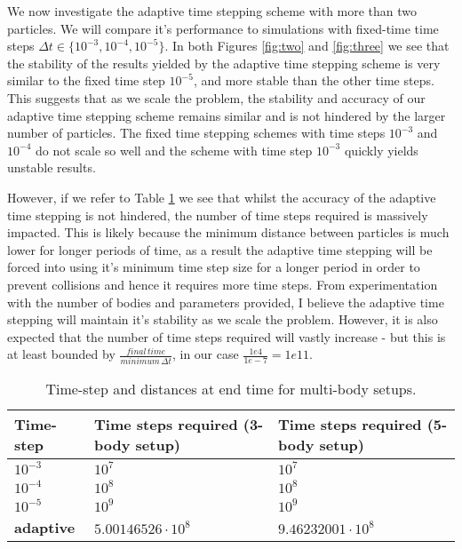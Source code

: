 \documentclass[12pt, a4paper]{article}
\begin{document}
\par We now investigate the adaptive time stepping scheme with more than two particles. We will compare it's performance to simulations with fixed-time time steps $\Delta t \in \{10^{-3}, 10^{-4}, 10^{-5}\}$. In both Figures \ref{fig:two} and \ref{fig:three} we see that the stability of the results yielded by the adaptive time stepping scheme is very similar to the fixed time step $10^{-5}$, and more stable than the other time steps. This suggests that as we scale the problem, the stability and accuracy of our adaptive time stepping scheme remains similar and is not hindered by the larger number of particles. The fixed time stepping schemes with time steps $10^{-3}$ and $10^{-4}$ do not scale so well and the scheme with  time step $10^{-3}$ quickly yields unstable results.
\par However, if we refer to Table \ref{tab:two} we see that whilst the accuracy of the adaptive time stepping is not hindered, the number of time steps required is massively impacted. This is likely because the minimum distance between particles is much lower for longer periods of time, as a result the adaptive time stepping will be forced into using it's minimum time step size for a longer period in order to prevent collisions and hence it requires more time steps. From experimentation with the number of bodies and parameters provided, I believe the adaptive time stepping will maintain it's stability as we scale the problem. However, it is also expected that the number of time steps required will vastly increase - but this is at least bounded by $\frac{final \, time}{minimum \, \Delta t}$, in our case $\frac{1e4}{1e-7} = 1e11$.

\begin{longtable}{|p{3cm}|p{7.5cm}|p{7.5cm}|}
\caption{Time-step and distances at end time for multi-body setups.}\\
\hline
\label{tab:two}
\bf{Time-step} & \bf{Time steps required (3-body setup)} &\bf{Time steps required (5-body setup)}\\ \hline

$10^{-3}$ & $10^7$&$10^7$\\ \hline
$10^{-4}$ & $10^8$ & $10^8$\\ \hline
$10^{-5}$ & $10^9$ & $10^9$\\ \hline
\textbf{adaptive} & $5.00146526 \cdot 10^8$ & $9.46232001 \cdot 10^8$\\ \hline
\end{longtable}
\end{document}
